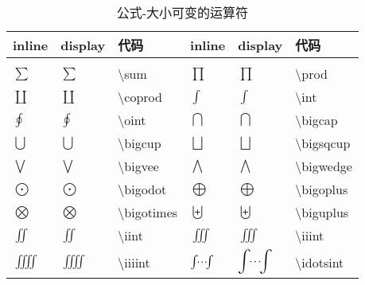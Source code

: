 \documentclass[UTF8,fontset=ubuntu]{ctexart}
\begin{document}
\begin{table}[H]
\begin{minipage}{\textwidth}
\begin{tabular}{l l l l l l}
    \hline
    inline & display & 代码 & inline & display & 代码\\
    \hline\\[-5mm]
    $\sum$ & $\displaystyle\sum$ & \textbackslash sum & $\prod$ & $\displaystyle\prod$ & \textbackslash prod\\[2mm]
	$\coprod$ & $\displaystyle\coprod$ & \textbackslash coprod & $\int$ & $\displaystyle\int$ & \textbackslash  int\\[2mm]
	$\oint$ & $\displaystyle\oint$ & \textbackslash  oint & $\bigcap$ & $\displaystyle\bigcap$ & \textbackslash  bigcap\\[2mm]
    $\bigcup$ & $\displaystyle\bigcup$ & \textbackslash  bigcup & $\bigsqcup$ & $\displaystyle\bigsqcup$ & \textbackslash  bigsqcup\\[2mm]
	$\bigvee$ & $\displaystyle\bigvee$ & \textbackslash  bigvee & $\bigwedge$ & $\displaystyle\bigwedge$ & \textbackslash  bigwedge\\[2mm]
	$\bigodot$ & $\displaystyle\bigodot$ & \textbackslash  bigodot & $\bigoplus$ & $\displaystyle\bigoplus$ & \textbackslash  bigoplus\\[2mm]
    $\bigotimes$ & $\displaystyle\bigotimes$ & \textbackslash  bigotimes & $\biguplus$ & $\displaystyle\biguplus$ & \textbackslash  biguplus\\[2mm]
	$\iint$ & $\displaystyle\iint$ & \textbackslash  iint & $\iiint$ & $\displaystyle\iiint$ & \textbackslash  iiint\\[3mm]
	$\iiiint$ & $\displaystyle\iiiint$ & \textbackslash  iiiint & $\idotsint$ & $\displaystyle\idotsint$ & \textbackslash  idotsint\\[2mm]
	\hline
\end{tabular}
\end{minipage}
\caption{公式-大小可变的运算符}
\end{table}
\end{document}
